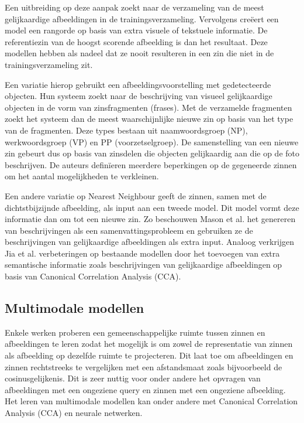 Een uitbreiding op deze aanpak zoekt naar de verzameling van de meest gelijkaardige afbeeldingen in de trainingsverzameling. Vervolgens cre\"eert een model een rangorde op basis van extra visuele of tekstuele informatie. De referentiezin van de hoogst scorende afbeelding is dan het resultaat\cite{Devlin2015a,Hodosh2013,Oliva2006,Ordonez2011}. 
Deze modellen hebben als nadeel dat ze nooit resulteren in een zin die niet in de trainingsverzameling zit.

Een variatie\cite{Gupta2012,Kuznetsova2012} hierop gebruikt een afbeeldingsvoorstelling met gedetecteerde objecten. Hun systeem zoekt naar de beschrijving van visueel gelijkaardige objecten in de vorm van zinsfragmenten (frases). Met de verzamelde fragmenten zoekt het systeem dan de meest waarschijnlijke nieuwe zin op basis van het type van de fragmenten. Deze types bestaan uit naamwoordsgroep (NP), werkwoordsgroep (VP) en PP (voorzetselgroep). De samenstelling van een nieuwe zin gebeurt dus op basis van zinsdelen die objecten gelijkaardig aan die op de foto beschrijven. De auteurs defin\"ieren meerdere beperkingen op de gegeneerde zinnen om het aantal mogelijkheden te verkleinen.

Een andere variatie op Nearest Neighbour geeft de zinnen, samen met de dichtstbijzijnde afbeelding, als input aan een tweede model. Dit model vormt deze informatie dan om tot een nieuwe zin. Zo beschouwen Mason et al.\cite{Mason2014} het genereren van beschrijvingen als een samenvattingsprobleem en gebruiken ze de beschrijvingen van gelijkaardige afbeeldingen als extra input. Analoog verkrijgen Jia et al.\cite{Fernando2015} verbeteringen op bestaande modellen door het toevoegen van extra semantische informatie zoals beschrijvingen van gelijkaardige afbeeldingen op basis van Canonical Correlation Analysis (CCA).
 
\subsection{Multimodale modellen}
Enkele werken proberen een gemeenschappelijke ruimte tussen zinnen en afbeeldingen te leren zodat het mogelijk is om zowel de representatie van zinnen als afbeelding op dezelfde ruimte te projecteren. Dit laat toe om afbeeldingen en zinnen rechtstreeks te vergelijken met een afstandsmaat zoals bijvoorbeeld de cosinusgelijkenis. Dit is zeer nuttig voor onder andere het opvragen van afbeeldingen met een ongeziene query en zinnen met een ongeziene afbeelding. Het leren van multimodale modellen kan onder andere met Canonical Correlation Analysis (CCA)\cite{Hodosh2013} en neurale netwerken\cite{Mao2014,Karpathy2014,Kiros2013}. 

